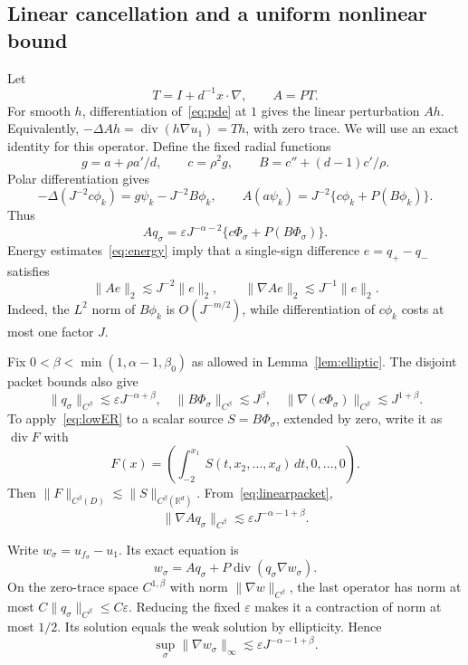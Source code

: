 \documentclass[11pt]{article}
\theoremstyle{remark}
\newcommand{\R}{\mathbb R}
\newcommand{\diver}{\operatorname{div}}
\newcommand{\norm}[1]{\lVert #1\rVert}
\begin{document}
\subsection{Linear cancellation and a uniform nonlinear bound}
Let
\[
 T=I+d^{-1}x\cdot\nabla,\qquad A=PT.
\]
For smooth $h$, differentiation of~\eqref{eq:pde} at $1$ gives the linear perturbation $Ah$. Equivalently, $-\Delta Ah=\diver(h\nabla u_1)=Th$, with zero trace. We will use an exact identity for this operator. Define the fixed radial functions
\[
 g=a+\rho a'/d,\qquad c=\rho^2g,\qquad
 B=c''+(d-1)c'/\rho.
\]
Polar differentiation gives
\[
 -\Delta(J^{-2}c\phi_k)=g\psi_k-J^{-2}B\phi_k,
 \qquad
 A(a\psi_k)=J^{-2}\{c\phi_k+P(B\phi_k)\}.
\]
Thus
\begin{equation}\label{eq:linearpacket}
 Aq_\sigma=\varepsilon J^{-\alpha-2}
 \{c\Phi_\sigma+P(B\Phi_\sigma)\}.
\end{equation}
Energy estimates~\eqref{eq:energy} imply that a single-sign difference $e=q_+-q_-$ satisfies
\begin{equation}\label{eq:singlelinear}
 \norm{Ae}_2\lesssim J^{-2}\norm e_2,
 \qquad \norm{\nabla Ae}_2\lesssim J^{-1}\norm e_2.
\end{equation}
Indeed, the $L^2$ norm of $B\phi_k$ is $O(J^{-m/2})$, while differentiation of $c\phi_k$ costs at most one factor $J$.

Fix $0<\beta<\min(1,\alpha-1,\beta_0)$ as allowed in Lemma~\ref{lem:elliptic}. The disjoint packet bounds also give
\[
 \norm{q_\sigma}_{C^\beta}\lesssim\varepsilon J^{-\alpha+\beta},\quad
 \norm{B\Phi_\sigma}_{C^\beta}\lesssim J^\beta,\quad
 \norm{\nabla(c\Phi_\sigma)}_{C^\beta}\lesssim J^{1+\beta}.
\]
To apply~\eqref{eq:lowER} to a scalar source $S=B\Phi_\sigma$, extended by zero, write it as $\diver F$ with
\[
 F(x)=\left(\int_{-2}^{x_1}S(t,x_2,\ldots,x_d)\,dt,0,\ldots,0\right).
\]
Then $\norm F_{C^\beta(D)}\lesssim\norm S_{C^\beta(\R^d)}$. From~\eqref{eq:linearpacket},
\begin{equation}\label{eq:linholder}
 \norm{\nabla Aq_\sigma}_{C^\beta}\lesssim
 \varepsilon J^{-\alpha-1+\beta}.
\end{equation}

Write $w_\sigma=u_{f_\sigma}-u_1$. Its exact equation is
\begin{equation}\label{eq:nonlinpacket}
 w_\sigma=Aq_\sigma+P\diver(q_\sigma\nabla w_\sigma).
\end{equation}
On the zero-trace space $C^{1,\beta}$ with norm $\norm{\nabla w}_{C^\beta}$, the last operator has norm at most $C\norm{q_\sigma}_{C^\beta}\le C\varepsilon$. Reducing the fixed $\varepsilon$ makes it a contraction of norm at most $1/2$. Its solution equals the weak solution by ellipticity. Hence
\begin{equation}\label{eq:nonlinuniform}
 \sup_\sigma\norm{\nabla w_\sigma}_\infty
 \lesssim\varepsilon J^{-\alpha-1+\beta}.
\end{equation}
\end{document}
